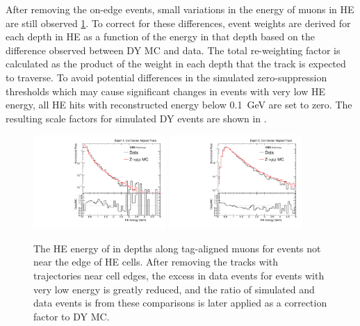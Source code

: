 After removing the on-edge events, small variations in the energy of muons in HE are still observed \cref{fig:nonEdgeHEEnergy}. 
To correct for these differences, event weights are derived for each depth in HE as a function of the energy in that depth based on the difference observed between DY MC and data.
The total re-weighting factor is calculated as the product of the weight in each depth that the track is expected to traverse.
To avoid potential differences in the simulated zero-suppression thresholds which may cause significant changes in events with very low HE energy, all HE hits with reconstructed energy below \SI{0.1}{\giga\eV} are set to zero.
The resulting scale factors for simulated DY events are shown in .

\begin{figure}[htbp]
	\centering
	\includegraphics[width=0.45\textwidth]{figures/hcalE_depth0.pdf}
        \hspace{0.01\textwidth}
        \includegraphics[width=0.45\textwidth]{figures/hcalE_depth4.pdf}
	\caption[Center-Aligned HE Energy]{The HE energy of in depths along tag-aligned muons for events not near the edge of HE cells. After removing the tracks with trajectories near cell edges, the excess in data events for events with very low energy is greatly reduced, and the ratio of simulated and data events is from these comparisons is later applied as a correction factor to DY MC.} 
        \label{fig:nonEdgeHEEnergy}
\end{figure}

